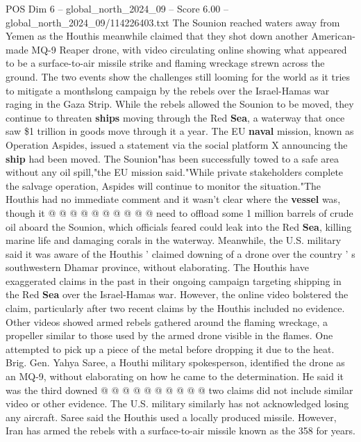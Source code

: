 \begin{textsample}{POS Dim 6 – global\_north\_2024\_09 – Score 6.00 – global\_north\_2024\_09/114226403.txt}  \label{ex:f6_pos_425}
The Sounion reached waters away from Yemen as the Houthis meanwhile claimed that they shot down another American-made MQ-9 Reaper drone, with video circulating online showing what appeared to be a surface-to-air missile strike and flaming wreckage strewn across the ground.
The two events show the challenges still looming for the world as it tries to mitigate a monthslong campaign by the rebels over the Israel-Hamas war raging in the Gaza Strip.
While the rebels allowed the Sounion to be moved, they continue to threaten \textbf{ships} moving through the Red \textbf{Sea}, a waterway that once saw \$1 trillion in goods move through it a year.
The EU \textbf{naval} mission, known as Operation Aspides, issued a statement via the social platform X announcing the \textbf{ship} had been moved.
The Sounion"has been successfully towed to a safe area without any oil spill,"the EU mission said."While private stakeholders complete the salvage operation, Aspides will continue to monitor the situation."The Houthis had no immediate comment and it wasn't clear where the \textbf{vessel} was, though it @ @ @ @ @ @ @ @ @ @ need to offload some 1 million barrels of crude oil aboard the Sounion, which officials feared could leak into the Red \textbf{Sea}, killing marine life and damaging corals in the waterway.
Meanwhile, the U.S. military said it was aware of the Houthis ' claimed downing of a drone over the country ' s southwestern Dhamar province, without elaborating.
The Houthis have exaggerated claims in the past in their ongoing campaign targeting shipping in the Red \textbf{Sea} over the Israel-Hamas war.
However, the online video bolstered the claim, particularly after two recent claims by the Houthis included no evidence.
Other videos showed armed rebels gathered around the flaming wreckage, a propeller similar to those used by the armed drone visible in the flames.
One attempted to pick up a piece of the metal before dropping it due to the heat.
Brig.
Gen.
Yahya Saree, a Houthi military spokesperson, identified the drone as an MQ-9, without elaborating on how he came to the determination.
He said it was the third downed @ @ @ @ @ @ @ @ @ @ two claims did not include similar video or other evidence.
The U.S. military similarly has not acknowledged losing any aircraft.
Saree said the Houthis used a locally produced missile.
However, Iran has armed the rebels with a surface-to-air missile known as the 358 for years.

\end{textsample}
